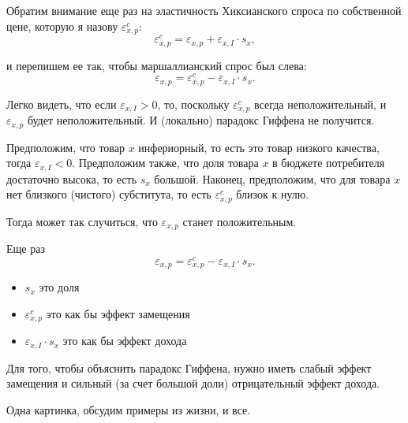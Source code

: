 \documentclass{beamer}
\begin{document}
\begin{frame}

Обратим внимание еще раз на эластичность Хиксианского спроса по собственной цене, которую я назову $\varepsilon^c_{x,p}$:
$$\varepsilon^c_{x,p} = \varepsilon_{x,p} + \varepsilon_{x,I} \cdot s_{x},$$

и перепишем ее так, чтобы маршаллианский спрос был слева:
$$\varepsilon_{x,p} = \varepsilon^c_{x,p} - \varepsilon_{x,I} \cdot s_{x}.$$

Легко видеть, что если $\varepsilon_{x,I} > 0$, то, поскольку $\varepsilon^c_{x,p}$ всегда неположительный, и $\varepsilon_{x,p}$ будет неположительный. И (локально) парадокс Гиффена не получится. 
\end{frame}

%
%
%

\begin{frame}
Предположим, что товар $x$ инфериорный, то есть это товар низкого качества, тогда $\varepsilon_{x,I} < 0$. Предположим также, что доля товара $x$ в бюджете потребителя достаточно высока, то есть $s_{x}$ большой. Наконец, предположим, что для товара $x$ нет близкого (чистого) субститута, то есть $\varepsilon^c_{x,p}$ близок к нулю.

Тогда может так случиться, что $\varepsilon_{x,p}$ станет положительным.

\end{frame}

\begin{frame}
Еще раз
$$\varepsilon_{x,p} = \varepsilon^c_{x,p} - \varepsilon_{x,I} \cdot s_{x}.$$

\begin{itemize}
\item $s_{x}$ это доля
\item $\varepsilon^c_{x,p}$ это как бы эффект замещения
\item $\varepsilon_{x,I} \cdot s_{x}$ это как бы эффект дохода
\end{itemize}

Для того, чтобы объяснить парадокс Гиффена, нужно иметь слабый эффект замещения и сильный (за счет большой доли) отрицательный эффект дохода.

Одна картинка, обсудим примеры из жизни, и все.

\end{frame}
\end{document}
